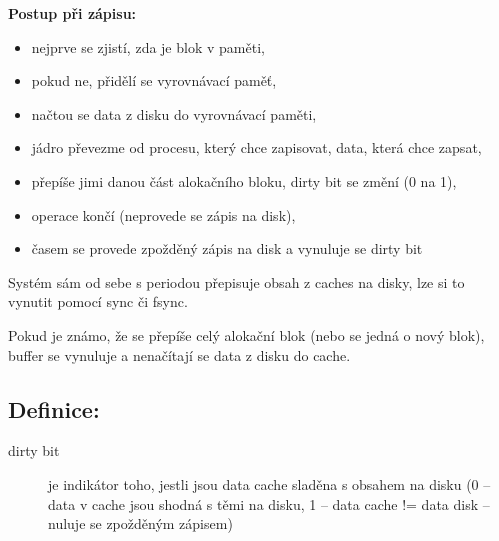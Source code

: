 \documentclass[a4paper, 11pt]{article}
\begin{document}
\textbf{Postup při zápisu:}
\begin{itemize}
    \item nejprve se zjistí, zda je blok v paměti,
    \item pokud ne, přidělí se vyrovnávací paměť,
    \item načtou se data z disku do vyrovnávací paměti,
    \item jádro převezme od procesu, který chce zapisovat, data, která chce zapsat,
    \item přepíše jimi danou část alokačního bloku, dirty bit se změní (0 na 1),
    \item operace končí (neprovede se zápis na disk),
    \item časem se provede zpožděný zápis na disk a vynuluje se dirty bit \\
\end{itemize}
 
Systém sám od sebe s periodou přepisuje obsah z caches na disky, lze si to vynutit pomocí sync či fsync.
 
Pokud je známo, že se přepíše celý alokační blok (nebo se jedná o nový blok), buffer se vynuluje a nenačítají se data z disku do cache.

\subsection*{Definice:}
\begin{description}
\item[dirty bit] je indikátor toho, jestli jsou data cache sladěna s obsahem na disku (0 -- data v cache jsou shodná s těmi na disku, 1 -- data cache != data disk -- nuluje se zpožděným zápisem)
\end{description}
\end{document}
